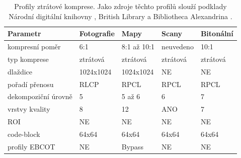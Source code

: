 \begin{table}[ht!]
\small
    \setlength{\tabcolsep}{3pt} %
    \renewcommand{\arraystretch}{1.5} %
    \begin{tabular}{|p{4cm}||p{2.5cm}|p{2.5cm}|p{2.5cm}|p{2.5cm}|}
      \hline
      \textbf{Parametr}             & \textbf{Fotografie}          & \textbf{Mapy}      & \textbf{Scany}    & \textbf{Bitonální} \\ 
      \hline
      kompresní poměr               & 6:1                          & 8:1 až 10:1        & neuvedeno         & 10:1 \\ 
      typ komprese                  & ztrátová                     & ztrátová           & ztrátová          & ztrátová \\ 
      dlaždice                      & 1024x1024                    & 1024x1024          & NE                & NE \\ 
      pořadí přenosu                & RLCP                         & RPCL               & RPCL              & RPCL \\ 
      dekompoziční úrovně           & 5                            & 5 až 6             & 6                 & 7 \\ 
      vrstvy kvality                & 8                            & 12                 & ANO               & 7 \\ 
      ROI                           & NE                           & NE                 & NE                & NE \\ 
      code-block                    & 64x64                        & 64x64              & 64x64             & 64x64 \\ 
      profily EBCOT                 & NE                           & Bypass             & NE                & NE \\ 
      \hline
    \end{tabular}
    \caption{Profily ztrátové komprese. Jako zdroje těchto profilů slouží podklady Národní digitální knihovny \cite{ndk}, British Library \cite{bl} a Bibliotheca Alexandrina \cite{al}.} 
\end{table}

